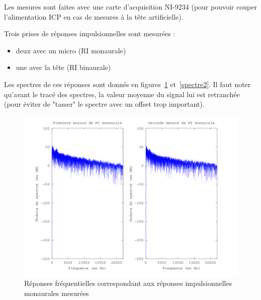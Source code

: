 \documentclass[12pt]{article}
\begin{document}
Les mesures sont faites avec une carte d'acquisition NI-9234 (pour pouvoir couper l'alimentation ICP en cas de mesures à
la tête artificielle).

Trois prises de réponses impulsionnelles sont mesurées :

\begin{itemize}
    \item deux avec un micro (RI monaurale)
    \item une avec la tête (RI binaurale)
\end{itemize}

Les spectres de ces réponses sont donnés en figures~\ref{spectre1} et~\ref{spectre2}.
Il faut noter qu'avant le tracé des spectres, la valeur moyenne du signal lui est retranchée (pour éviter de "tasser" le
spectre avec un offset trop important).

\begin{figure}[h]
    \vfill\begin{center}
        \includegraphics[scale=0.6]{ris_monaurales.png}
    \end{center}\vfill
    \caption{\label{spectre1} Réponses fréquentielles correspondant aux réponses impulsionnelles monaurales mesurées}
\end{figure}
\end{document}
